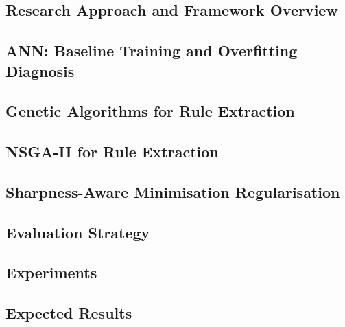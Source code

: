 
\label{sec:methodology}

\subsection{Research Approach and Framework Overview}


\subsection{ANN: Baseline Training and Overfitting Diagnosis}


\subsection{Genetic Algorithms for Rule Extraction}


\subsection{NSGA-II for Rule Extraction}


\subsection{Sharpness-Aware Minimisation Regularisation}


\subsection{Evaluation Strategy}


\subsection{Experiments}


\subsection{Expected Results}

